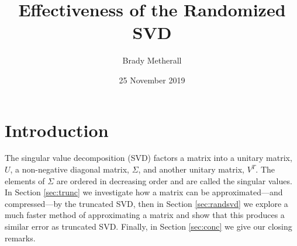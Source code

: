 \documentclass[11pt, a4paper, twocolumn]{article}
\title{Effectiveness of the Randomized SVD}
\author{Brady Metherall}
\date{25 November 2019}
\begin{document}
\maketitle

\section{Introduction}
The singular value decomposition (SVD) factors a matrix into a unitary matrix, $U$, a non-negative diagonal matrix, $\Sigma$, and another unitary matrix, $V^T$. The elements of $\Sigma$ are ordered in decreasing order and are called the singular values. In Section \ref{sec:trunc} we investigate how a matrix can be approximated---and compressed---by the truncated SVD, then in Section \ref{sec:randsvd} we explore a much faster method of approximating a matrix and show that this produces a similar error as truncated SVD. Finally, in Section \ref{sec:conc} we give our closing remarks.
\end{document}
